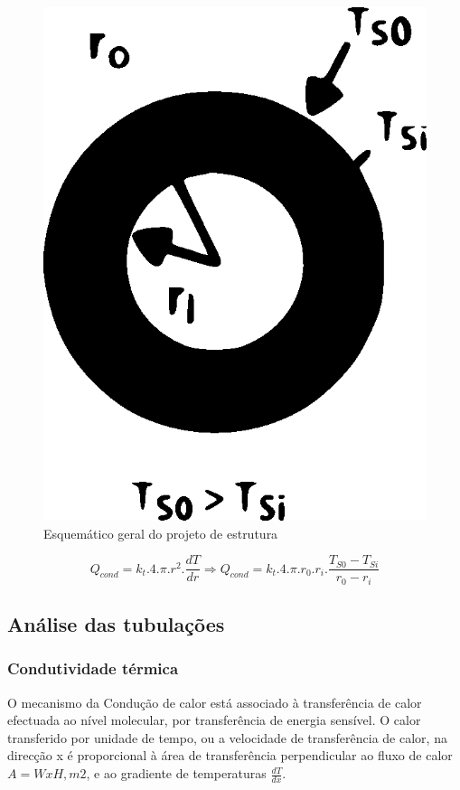 \begin{figure}[!htb]                                                               
   \centering                                                                      
   \includegraphics[width=15cm, keepaspectratio=true]{figuras/Teste12_1.eps}
   \caption{Esquemático geral do projeto de estrutura}                        
\end{figure}

$$ Q_{cond} = k_{t}.4.\pi.r^2.\frac{dT}{dr} \Longrightarrow Q_{cond} = k_{t}.4.\pi.r_{0}.r_{i}.\frac{T_{S0}-T_{Si}}{r_{0}-r_{i}}$$


\subsection{Análise das tubulações}

\subsubsection{Condutividade térmica}
O mecanismo da Condução de calor está associado à transferência de calor efectuada ao nível molecular, por transferência de energia sensível. O calor transferido por unidade de tempo, ou a velocidade de transferência de calor, na direcção x é proporcional à área de transferência perpendicular ao fluxo de calor $A=WxH, m2$, e ao gradiente de temperaturas $\frac{dT}{dx}$.

